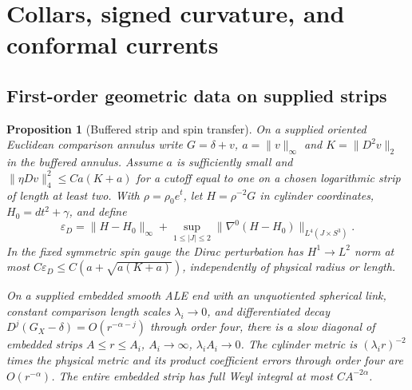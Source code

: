 \documentclass[11pt]{article}
\newtheorem{proposition}[theorem]{Proposition}
\theoremstyle{definition}
\theoremstyle{remark}
\begin{document}
\section{Collars, signed curvature, and conformal currents}\label{sec:collars}

\subsection{First-order geometric data on supplied strips}

\begin{proposition}[Buffered strip and spin transfer]\label{prop:spin-strip}
On a supplied oriented Euclidean comparison annulus write \(G=\delta+v\), \(a=\|v\|_\infty\) and \(K=\|D^2v\|_2\) in the buffered annulus. Assume \(a\) is sufficiently small and \(\|\eta Dv\|_4^2\le Ca(K+a)\) for a cutoff equal to one on a chosen logarithmic strip of length at least two. With \(\rho=\rho_0e^t\), let \(H=\rho^{-2}G\) in cylinder coordinates, \(H_0=dt^2+\gamma\), and define
\[
 \varepsilon_D=\|H-H_0\|_\infty+
    \sup_{1\le |J|\le 2}\|\nabla^0(H-H_0)\|_{L^4(J\times S^3)} .
\]
In the fixed symmetric spin gauge the Dirac perturbation has \(H^1\to L^2\) norm at most \(C\varepsilon_D\le C(a+\sqrt{a(K+a)})\), independently of physical radius or length.

On a supplied embedded smooth ALE end with an unquotiented spherical link, constant comparison length scales \(\lambda_i\to0\), and differentiated decay \(D^j(G_X-\delta)=O(r^{-\alpha-j})\) through order four, there is a slow diagonal of embedded strips \(A\le r\le A_i\), \(A_i\to\infty\), \(\lambda_i A_i\to0\). The cylinder metric is \((\lambda_i r)^{-2}\) times the physical metric and its product coefficient errors through order four are \(O(r^{-\alpha})\). The entire embedded strip has full Weyl integral at most \(C A^{-2\alpha}\).
\end{proposition}
\end{document}
